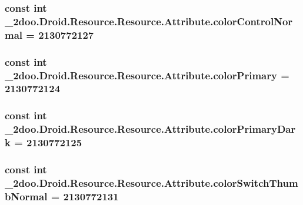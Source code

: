 \hypertarget{class__2doo_1_1_droid_1_1_resource_1_1_attribute_125525ed34185e5b1153141c79cea9e5}{
\subsubsection[{colorControlNormal}]{\setlength{\rightskip}{0pt plus 5cm}const int \_\-2doo.Droid.Resource.Resource.Attribute.colorControlNormal = 2130772127}}
\label{class__2doo_1_1_droid_1_1_resource_1_1_attribute_125525ed34185e5b1153141c79cea9e5}


\hypertarget{class__2doo_1_1_droid_1_1_resource_1_1_attribute_9e821045460b886be36cf03de34e4675}{
\subsubsection[{colorPrimary}]{\setlength{\rightskip}{0pt plus 5cm}const int \_\-2doo.Droid.Resource.Resource.Attribute.colorPrimary = 2130772124}}
\label{class__2doo_1_1_droid_1_1_resource_1_1_attribute_9e821045460b886be36cf03de34e4675}


\hypertarget{class__2doo_1_1_droid_1_1_resource_1_1_attribute_5c64ff68d05a99b6080ef27b779bd4d3}{
\subsubsection[{colorPrimaryDark}]{\setlength{\rightskip}{0pt plus 5cm}const int \_\-2doo.Droid.Resource.Resource.Attribute.colorPrimaryDark = 2130772125}}
\label{class__2doo_1_1_droid_1_1_resource_1_1_attribute_5c64ff68d05a99b6080ef27b779bd4d3}


\hypertarget{class__2doo_1_1_droid_1_1_resource_1_1_attribute_f419879108000e85f8d11c2874e7879e}{
\subsubsection[{colorSwitchThumbNormal}]{\setlength{\rightskip}{0pt plus 5cm}const int \_\-2doo.Droid.Resource.Resource.Attribute.colorSwitchThumbNormal = 2130772131}}
\label{class__2doo_1_1_droid_1_1_resource_1_1_attribute_f419879108000e85f8d11c2874e7879e}


